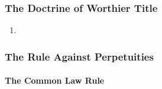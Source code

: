 \subsubsection{The Doctrine of Worthier Title}

\begin{enumerate}
    \item %
\end{enumerate}

\subsubsection{The Rule Against Perpetuities}
\paragraph{The Common Law Rule}

